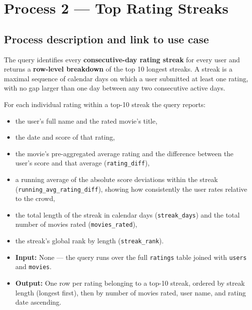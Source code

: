\documentclass[11pt, a4paper]{article}
\begin{document}
\section{Process 2 --- Top Rating Streaks}
\label{sec:process2}

\subsection{Process description and link to use case}


The query identifies every \textbf{consecutive-day rating streak} for every
user and returns a \textbf{row-level breakdown} of the top 10 longest
streaks. A streak is a maximal sequence of calendar days on which a user
submitted at least one rating, with no gap larger than one day between any
two consecutive active days.

For each individual rating within a top-10 streak the query reports:

\begin{itemize}
    \item the user's full name and the rated movie's title,
    \item the date and score of that rating,
    \item the movie's pre-aggregated average rating and the difference
          between the user's score and that average (\texttt{rating\_diff}),
    \item a running average of the absolute score deviations within the
          streak (\texttt{running\_avg\_rating\_diff}), showing how
          consistently the user rates relative to the crowd,
    \item the total length of the streak in calendar days
          (\texttt{streak\_days}) and the total number of movies rated
          (\texttt{movies\_rated}),
    \item the streak's global rank by length (\texttt{streak\_rank}).
\end{itemize}

\begin{itemize}
    \item \textbf{Input:} None --- the query runs over the full
    \texttt{ratings} table joined with \texttt{users} and \texttt{movies}.
    \item \textbf{Output:} One row per rating belonging to a top-10 streak,
    ordered by streak length (longest first), then by number of movies rated,
    user name, and rating date ascending.
\end{itemize}
\end{document}
